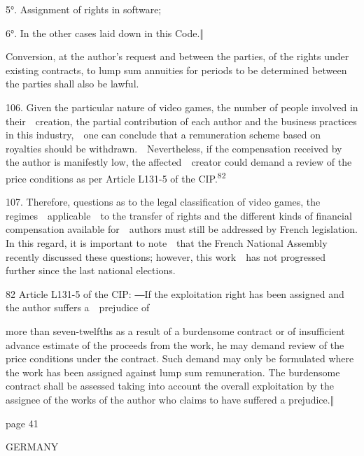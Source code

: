 \documentclass[
]{article}
\begin{document}
{5°. Assignment of rights in software;}

{6°. }{In the other cases laid down in this Code.‖}

{Conversion, at the author's request and between }{the parties, of the
rights under existing contracts, to lump sum annuities for periods to be
determined between the parties shall also be lawful.}

{106. }{Given the particular nature of video games, the number of people
involved in their~~creation, the partial contribution of each author and
the business practices in this industry,~~one can conclude that a
remuneration scheme based on royalties should be
withdrawn.~~Nevertheless, if the compensation received by the author is
manifestly low, the affected~~creator could demand a review of the price
conditions as per Article L131-5 of the }{CIP.}\textsuperscript{{82}}

{107. }{Therefore, questions as to the legal classification of video
games, the regimes~~applicable~~to the transfer of rights and the
different kinds of financial compensation available for~~authors must
still be addressed by French legislation. In this regard, it is
important to note~~that the French National Assembly recently discussed
these questions; however, this work~~has not progressed further since
the last national elections.}

{82 }{Article L131-5 of the }{CIP}{: }{―}{If the exploitation right has
been assigned and the author suffers a~~prejudice of}

{more than seven-twelfths as a result of a burdensome contract or of
insufficient advance estimate of the proceeds from the work, he may
demand review of the price conditions under the contract. Such demand
may only be formulated where the work has been assigned against lump sum
remuneration. The burdensome contract shall be assessed taking into
account the overall exploitation by the assignee of the works of the
author who claims to have suffered a prejudice.}{‖}

{page 41}

{GERMANY}
\end{document}
